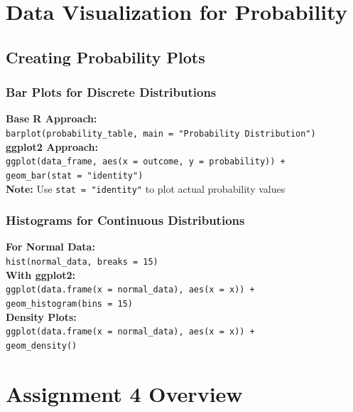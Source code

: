 \documentclass[11pt,a4paper]{article}
\begin{document}
\section{Data Visualization for Probability}

\subsection{Creating Probability Plots}

\subsubsection{Bar Plots for Discrete Distributions}

\begin{formulabox}
\textbf{Base R Approach:}\\
\texttt{barplot(probability\_table, main = "Probability Distribution")}\\[0.3cm]
\textbf{ggplot2 Approach:}\\
\texttt{ggplot(data\_frame, aes(x = outcome, y = probability)) +}\\
\texttt{geom\_bar(stat = "identity")}\\[0.3cm]
\textbf{Note:} Use \texttt{stat = "identity"} to plot actual probability values
\end{formulabox}

\subsubsection{Histograms for Continuous Distributions}

\begin{formulabox}
\textbf{For Normal Data:}\\
\texttt{hist(normal\_data, breaks = 15)}\\[0.3cm]
\textbf{With ggplot2:}\\
\texttt{ggplot(data.frame(x = normal\_data), aes(x = x)) +}\\
\texttt{geom\_histogram(bins = 15)}\\[0.3cm]
\textbf{Density Plots:}\\
\texttt{ggplot(data.frame(x = normal\_data), aes(x = x)) +}\\
\texttt{geom\_density()}
\end{formulabox}

\section{Assignment 4 Overview}
\end{document}
